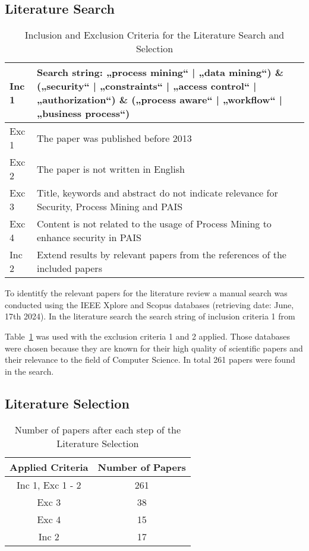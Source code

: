 \documentclass[runningheads]{llncs}
\begin{document}
\subsection{Literature Search}\label{Search}
\begin{table}[h!]
    \centering
    \begin{tabular}{ | m{1cm} | m{11cm} | }
        \hline
        Inc 1 & Search string: „process mining“ | „data mining“) \& („security“ | „constraints“ | „access control“ | „authorization“) \& („process aware“ | „workflow“ | „business process“)\\
        \hline
        Exc 1 & The paper was published before 2013 \\
        \hline
        Exc 2 & The paper is not written in English \\
        \hline
        Exc 3 & Title, keywords and abstract do not indicate relevance for Security, Process Mining and PAIS \\
        \hline
        Exc 4 & Content is not related to the usage of Process Mining to enhance security in PAIS \\
        \hline
        Inc 2 & Extend results by relevant papers from the references of the included papers \\
        \hline
    \end{tabular}
    \caption{Inclusion and Exclusion Criteria for the Literature Search and Selection}
    \label{criteria}
\end{table}
To identitfy the relevant papers for the literature review a manual search was conducted using the IEEE Xplore and Scopus databases (retrieving date: June, 17th 2024). In the literature search the search string of inclusion criteria 1 from

Table~\ref{criteria} was used with the exclusion criteria 1 and 2 applied. Those databases were chosen because they are known for their high quality of scientific papers and their relevance to the field of Computer Science. In total 261 papers were found in the search.
\subsection{Literature Selection}\label{Selection}
\begin{table}[h!]
    \centering
    \begin{tabular}{ |c|c|}
        \hline
        \textbf{Applied Criteria} & \textbf{Number of Papers}\\
        \hline
        \hline
        Inc 1, Exc 1 - 2 & 261\\
        \hline
        Exc 3 & 38\\
        \hline
        Exc 4 & 15\\
        \hline
        Inc 2 & 17\\
        \hline
    \end{tabular}
    \caption{Number of papers after each step of the Literature Selection}
    \label{selection}
\end{table}
\end{document}

